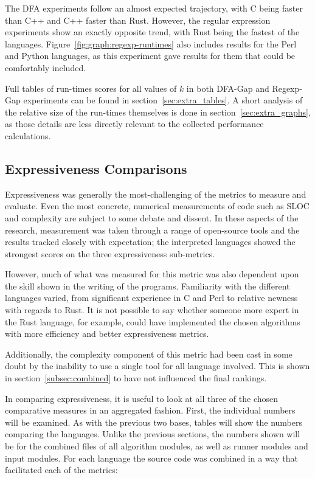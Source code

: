 The DFA experiments follow an almost expected trajectory, with C being faster than C++ and C++ faster than Rust. However, the regular expression experiments show an exactly opposite trend, with Rust being the fastest of the languages. Figure~\ref{fig:graph:regexp-runtimes} also includes results for the Perl and Python languages, as this experiment gave results for them that could be comfortably included.

Full tables of run-times scores for all values of $k$ in both DFA-Gap and Regexp-Gap experiments can be found in section~\ref{sec:extra_tables}. A short analysis of the relative size of the run-times themselves is done in section~\ref{sec:extra_graphs}, as those details are less directly relevant to the collected performance calculations.

\subsection{Expressiveness Comparisons}
\label{subsec:expr_comp}

Expressiveness was generally the most-challenging of the metrics to measure and evaluate. Even the most concrete, numerical measurements of code such as SLOC and complexity are subject to some debate and dissent. In these aspects of the research, measurement was taken through a range of open-source tools and the results tracked closely with expectation; the interpreted languages showed the strongest scores on the three expressiveness sub-metrics.

However, much of what was measured for this metric was also dependent upon the skill shown in the writing of the programs. Familiarity with the different languages varied, from significant experience in C and Perl to relative newness with regards to Rust. It is not possible to say whether someone more expert in the Rust language, for example, could have implemented the chosen algorithms with more efficiency and better expressiveness metrics.

Additionally, the complexity component of this metric had been cast in some doubt by the inability to use a single tool for all language involved. This is shown in section~\ref{subsec:combined} to have not influenced the final rankings.

In comparing expressiveness, it is useful to look at all three of the chosen comparative measures in an aggregated fashion. First, the individual numbers will be examined. As with the previous two bases, tables will show the numbers comparing the languages. Unlike the previous sections, the numbers shown will be for the combined files of all algorithm modules, as well as runner modules and input modules. For each language the source code was combined in a way that facilitated each of the metrics:

